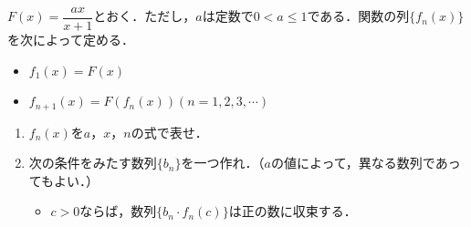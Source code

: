 $F(x)=\dfrac{ax}{x+1}$とおく．ただし，$a$は定数で$0 < a\le 1$である．関数の列$\{f_n(x)\}$を次によって定める．

\begin{itemize}
  \item[(i)] $f_1(x)=F(x)$
  \item[(ii)] $f_{n+1}(x)=F(f_n(x)) (n=1,2,3,\cdots)$
\end{itemize}
\begin{enumerate}
  \item $f_n(x)$を$a$，$x$，$n$の式で表せ．
  \item 次の条件をみたす数列$\{b_n\}$を一つ作れ．（$a$の値によって，異なる数列であってもよい．）
        \begin{itemize}
          \item[条件] $c>0$ならば，数列$\{b_n\cdot f_n(c)\}$は正の数に収束する．
        \end{itemize}
\end{enumerate}
